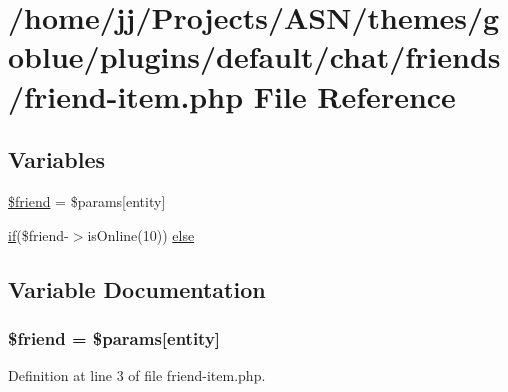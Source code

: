 \hypertarget{themes_2goblue_2plugins_2default_2chat_2friends_2friend-item_8php}{}\section{/home/jj/\+Projects/\+A\+S\+N/themes/goblue/plugins/default/chat/friends/friend-\/item.php File Reference}
\label{themes_2goblue_2plugins_2default_2chat_2friends_2friend-item_8php}
\subsection*{Variables}
\begin{DoxyCompactItemize}
\item 
\hyperlink{themes_2goblue_2plugins_2default_2chat_2friends_2friend-item_8php_a614b5c5dbf84346f452abdd7d0429bce}{\$friend} = \$params\mbox{[}\textquotesingle{}entity\textquotesingle{}\mbox{]}
\item 
\hyperlink{jquery_8tokeninput_8js_ad8dd46a3cbc004569e34401e9e71771a}{if}(\$friend-\/$>$is\+Online(10)) \hyperlink{themes_2goblue_2plugins_2default_2chat_2friends_2friend-item_8php_ae7fb94bbc6a8d91f8b55e0963d7ef464}{else}
\end{DoxyCompactItemize}


\subsection{Variable Documentation}
\subsubsection[{\texorpdfstring{\$friend}{$friend}}]{\setlength{\rightskip}{0pt plus 5cm}\$friend = \$params\mbox{[}\textquotesingle{}entity\textquotesingle{}\mbox{]}}\hypertarget{themes_2goblue_2plugins_2default_2chat_2friends_2friend-item_8php_a614b5c5dbf84346f452abdd7d0429bce}{}\label{themes_2goblue_2plugins_2default_2chat_2friends_2friend-item_8php_a614b5c5dbf84346f452abdd7d0429bce}


Definition at line 3 of file friend-\/item.\+php.

